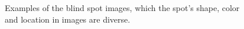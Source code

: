\documentclass[sensors,article,submit,moreauthors,pdftex,10pt,a4paper]{mdpi}
\begin{document}
\begin{figure}[H]
\centering
{}
\caption{Examples of the blind spot images, which the spot's shape, color and location in images are diverse.}
\label{blindSpotFigure}
\end{figure} 
\end{document}

